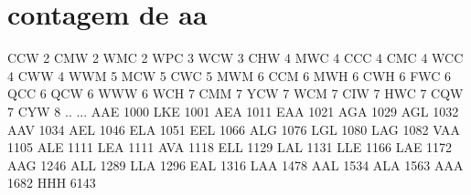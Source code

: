 \section{contagem de aa}
CCW      2
CMW      2
WMC      2
WPC      3
WCW      3
CHW      4
MWC      4
CCC      4
CMC      4
WCC      4
CWW      4
WWM      5
MCW      5
CWC      5
MWM      6
CCM      6
MWH      6
CWH      6
FWC      6
QCC      6
QCW      6
WWW      6
WCH      7
CMM      7
YCW      7
WCM      7
CIW      7
HWC      7
CQW      7
CYW      8
..     ...
AAE   1000
LKE   1001
AEA   1011
EAA   1021
AGA   1029
AGL   1032
AAV   1034
AEL   1046
ELA   1051
EEL   1066
ALG   1076
LGL   1080
LAG   1082
VAA   1105
ALE   1111
LEA   1111
AVA   1118
ELL   1129
LAL   1131
LLE   1166
LAE   1172
AAG   1246
ALL   1289
LLA   1296
EAL   1316
LAA   1478
AAL   1534
ALA   1563
AAA   1682
HHH   6143